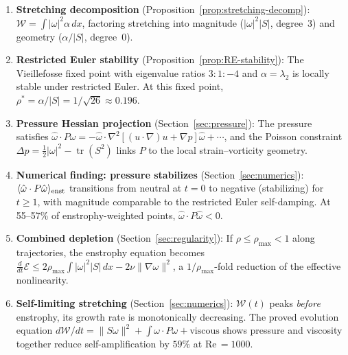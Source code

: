 \documentclass[11pt,a4paper]{article}
\theoremstyle{plain}
\theoremstyle{definition}
\theoremstyle{remark}
\DeclareMathOperator{\tr}{tr}
\begin{document}
\begin{enumerate}[label=(\roman*),leftmargin=2em]
\item \textbf{Stretching decomposition}
  (Proposition~\ref{prop:stretching-decomp}):
  $\mathcal{W} = \int|\omega|^2\alpha\,dx$, factoring
  stretching into magnitude ($|\omega|^2|S|$, degree~3)
  and geometry ($\alpha/|S|$, degree~0).

\item \textbf{Restricted Euler stability}
  (Proposition~\ref{prop:RE-stability}):
  The Vieillefosse fixed point with eigenvalue ratios
  $3:1:-4$ and $\alpha = \lambda_2$ is locally stable
  under restricted Euler.  At this fixed point,
  $\rho^* = \alpha/|S| = 1/\sqrt{26}\approx 0.196$.

\item \textbf{Pressure Hessian projection}
  (Section~\ref{sec:pressure}):
  The pressure satisfies
  $\hat\omega\cdot P\hat\omega
  = -\hat\omega\cdot\nabla^2[(u\cdot\nabla)u
  + \nabla p]\hat\omega + \cdots$, and the Poisson
  constraint $\Delta p = \frac{1}{2}|\omega|^2
  - \tr(S^2)$ links $P$ to the local
  strain--vorticity geometry.

\item \textbf{Numerical finding: pressure stabilizes}
  (Section~\ref{sec:numerics}):
  $\langle\hat\omega\cdot P\hat\omega\rangle_{\rm enst}$
  transitions from neutral at $t=0$ to negative
  (stabilizing) for $t\geq 1$, with magnitude
  comparable to the restricted Euler self-damping.
  At 55--57\% of enstrophy-weighted points,
  $\hat\omega\cdot P\hat\omega < 0$.

\item \textbf{Combined depletion}
  (Section~\ref{sec:regularity}):
  If $\rho\leq\rho_{\max}<1$ along trajectories,
  the enstrophy equation becomes
  $\frac{d}{dt}\mathcal{E}\leq
  2\rho_{\max}\int|\omega|^2|S|\,dx
  - 2\nu\|\nabla\omega\|^2$,
  a $1/\rho_{\max}$-fold reduction of the effective
  nonlinearity.

\item \textbf{Self-limiting stretching}
  (Section~\ref{sec:numerics}):
  $\mathcal{W}(t)$ peaks \emph{before} enstrophy,
  its growth rate is monotonically decreasing.
  The proved evolution equation
  $d\mathcal{W}/dt = \|S\omega\|^2
  + \int\omega\cdot P\omega + \text{viscous}$
  shows pressure and viscosity together reduce
  self-amplification by $59\%$ at Re$\,=1000$.
\end{enumerate}


\end{document}
